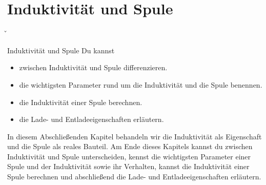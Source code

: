 



\section{Induktivität und Spule}


\v{
	\begin{frame}
		\begin{Lernziele}{Induktivität und Spule}
			Du kannst
			\begin{itemize}
				\item zwischen Induktivität und Spule differenzieren.
				\item die wichtigsten Parameter rund um die Induktivität und die Spule benennen.
				\item die Induktivität einer Spule berechnen.
				\item die Lade- und Entladeeigenschaften erläutern.
			\end{itemize}
		\end{Lernziele}
		{In diesem Abschließenden Kapitel behandeln wir die Induktivität als Eigenschaft und die Spule als reales Bauteil.
			Am Ende dieses Kapitels kannst du zwischen Induktivität und Spule unterscheiden, kennst die wichtigsten Parameter einer Spule und der Induktivität sowie ihr Verhalten, kannst die Induktivität einer Spule berechnen und abschließend die Lade- und Entladeeigenschaften erläutern.}
	\end{frame}
}

